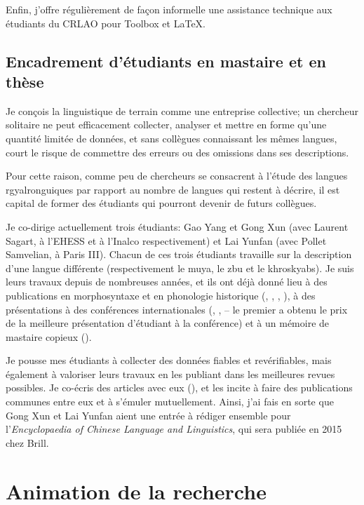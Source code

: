 \documentclass[oldfontcommands,oneside,a4paper,11pt]{article}
\begin{document}
Enfin, j'offre régulièrement de façon informelle une assistance technique aux étudiants du CRLAO pour Toolbox et \LaTeX{}.

\subsection{Encadrement d'étudiants en mastaire et en thèse} \label{sec:theses}
Je conçois la linguistique de terrain comme une entreprise collective; un chercheur solitaire ne peut efficacement collecter, analyser et mettre en forme qu'une quantité limitée de données, et sans collègues connaissant les mêmes langues, court le risque de commettre des erreurs ou des omissions dans ses descriptions.

Pour cette raison, comme peu de chercheurs se consacrent à l'étude des langues rgyalronguiques par rapport au nombre de langues qui restent à décrire, il est capital de former des étudiants qui pourront devenir de futurs collègues. 

Je co-dirige actuellement trois étudiants: Gao Yang et Gong Xun (avec Laurent Sagart, à l'EHESS et à l'Inalco respectivement) et Lai Yunfan (avec Pollet Samvelian, à Paris III). Chacun de ces trois étudiants travaille sur la description d'une langue différente (respectivement le muya, le zbu et le khroskyabs). Je suis leurs travaux depuis de nombreuses années, et ils ont déjà donné lieu à des publications en morphosyntaxe et en phonologie historique  (\citealt{gongxun14agreement}, \citealt{lai13fuyin}, \citealt{lai14person}, \citealt{jacques14rtau}), à des présentations à des conférences internationales (\citealt{gong14prosodic.tibetan}, \citealt{gong14prenasalized}, \citealt{lai14caus} -- le premier a obtenu le prix de la meilleure présentation d'étudiant à la conférence) et à un mémoire de mastaire copieux  (\citealt{lai13affixale}).

Je pousse mes étudiants à collecter des données fiables et revérifiables, mais également à valoriser leurs travaux en les publiant dans les meilleures revues possibles. Je co-écris des articles avec eux (\citealt{jacques14rtau}), et les incite à faire des publications communes entre eux et à s'émuler mutuellement. Ainsi, j'ai fais en sorte que Gong Xun et Lai Yunfan aient une entrée à rédiger ensemble pour l'\textit{Encyclopaedia of Chinese Language and Linguistics}, qui sera publiée en 2015 chez Brill.



\section{Animation de la recherche} \label{sec:animation}
\end{document}
